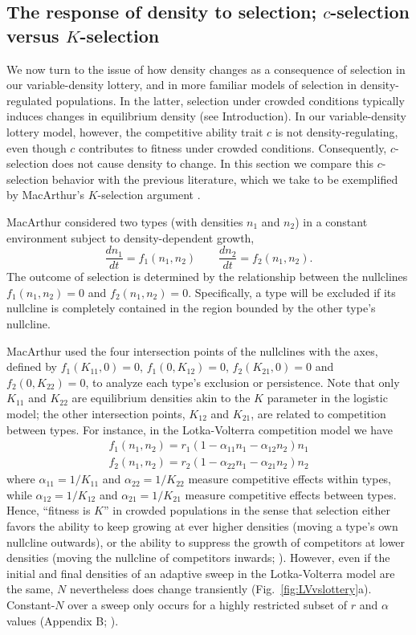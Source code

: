 \documentclass[12pt]{article}
\begin{document}
\subsection*{The response of density to selection; $c$-selection versus $K$-selection}

We now turn to the issue of how density changes as a consequence of selection in our variable-density lottery, and in more familiar models of selection in density-regulated populations. In the latter, selection under crowded conditions typically induces changes in equilibrium density (see Introduction). In our variable-density lottery model, however, the competitive ability trait $c$ is not density-regulating, even though $c$ contributes to fitness under crowded conditions. Consequently, $c$-selection does not cause density to change. In this section we compare this $c$-selection behavior with the previous literature, which we take to be exemplified by MacArthur's $K$-selection argument \citep{macarthur_1967}.

MacArthur considered two types (with densities $n_1$ and $n_2$) in a constant environment subject to density-dependent growth,
\begin{equation}
\frac{d n_1}{d t}=f_1(n_1,n_2)\qquad\frac{d n_2}{d t}=f_2(n_1,n_2). \label{eq:macgeneral}
\end{equation}
The outcome of selection is determined by the relationship between the nullclines $f_1(n_1,n_2)=0$ and $f_2(n_1,n_2)=0$. Specifically, a type will be excluded if its nullcline is completely contained in the region bounded by the other type's nullcline. 

MacArthur used the four intersection points of the nullclines with the axes, defined by $f_1(K_{11},0)=0$, $f_1(0,K_{12})=0$, $f_2(K_{21},0)=0$ and $f_2(0,K_{22})=0$, to analyze each type's exclusion or persistence. Note that only $K_{11}$ and $K_{22}$ are equilibrium densities akin to the $K$ parameter in the logistic model; the other intersection points, $K_{12}$ and $K_{21}$, are related to competition between types. For instance, in the Lotka-Volterra competition model we have
\begin{align}
f_1(n_1,n_2) = r_1(1-\alpha_{11}n_1-\alpha_{12}n_2)n_1\nonumber\\
f_2(n_1,n_2) = r_2(1-\alpha_{22}n_1-\alpha_{21}n_2)n_2\label{eq:LV}
\end{align}
where $\alpha_{11}=1/K_{11}$ and $\alpha_{22}=1/K_{22}$ measure competitive effects within types, while $\alpha_{12}=1/K_{12}$ and $\alpha_{21}=1/K_{21}$ measure competitive effects between types. Hence, ``fitness is $K$'' in crowded populations \citep[pp. 149]{macarthur_1967} in the sense that selection either favors the ability to keep growing at ever higher densities (moving a type's own nullcline outwards), or the ability to suppress the growth of competitors at lower densities (moving the nullcline of competitors inwards; \citealt{gill_1974}). However, even if the initial and final densities of an adaptive sweep in the Lotka-Volterra model are the same, $N$ nevertheless does change transiently (Fig.~\ref{fig:LVvslottery}a). Constant-$N$ over a sweep only occurs for a highly restricted subset of $r$ and $\alpha$ values (Appendix B; \citealt{mallet_2012,gill_1974,smouse_1976}).
\end{document}
